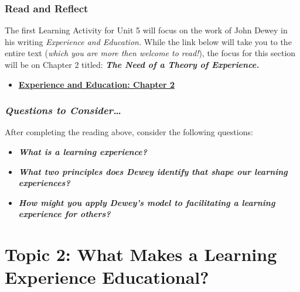 \documentclass[
]{book}
\providecommand{\tightlist}{%
  \setlength{\itemsep}{0pt}\setlength{\parskip}{0pt}}
\begin{document}
\begin{reflect}
\hypertarget{read-and-reflect-4}{%
\subsubsection{Read and Reflect}\label{read-and-reflect-4}}

The first Learning Activity for Unit 5 will focus on the work of John Dewey in his writing \emph{Experience and Education.} While the link below will take you to the entire text (\emph{which you are more then welcome to read!}), the focus for this section will be on Chapter 2 titled: \textbf{\emph{The Need of a Theory of Experience.}}

\begin{itemize}
\tightlist
\item
  \href{http://ruby.fgcu.edu/courses/ndemers/colloquium/experienceducationdewey.pdf}{\textbf{Experience and Education: Chapter 2}}
\end{itemize}

\hypertarget{questions-to-consider}{%
\subsubsection{\texorpdfstring{\textbf{\emph{Questions to Consider\ldots{}}}}{Questions to Consider\ldots{}}}\label{questions-to-consider}}

After completing the reading above, consider the following questions:

\begin{itemize}
\tightlist
\item
  \textbf{\emph{What is a learning experience?}}\\
\item
  \textbf{\emph{What two principles does Dewey identify that shape our learning experiences?}}\\
\item
  \textbf{\emph{How might you apply Dewey's model to facilitating a learning experience for others?}}
\end{itemize}
\end{reflect}

\hypertarget{topic-2-what-makes-a-learning-experience-educational}{%
\section*{Topic 2: What Makes a Learning Experience Educational?}\label{topic-2-what-makes-a-learning-experience-educational}}
\end{document}
